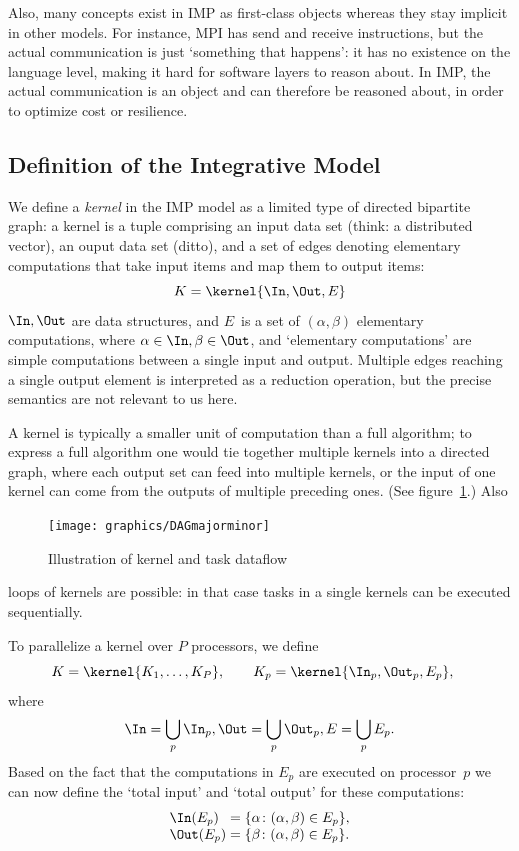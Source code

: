 Also, many concepts exist in \ac{IMP} as first-class objects whereas they stay
implicit in other models. For instance, MPI has send and receive instructions, but
the actual communication is just `something that happens': it has no existence 
on the language level, making it hard for software layers to reason about. 
In \ac{IMP}, the actual communication is an object and can therefore be reasoned about,
in order to optimize cost or resilience.

\subsection{Definition of the Integrative Model}

We define a \emph{kernel} in the \ac{IMP} model
as a limited type of directed bipartite graph:
a kernel is
a tuple comprising an input data set (think: a distributed vector), an
ouput data set (ditto), and a set of edges denoting elementary
computations that take input items and map them to output items:
\[ K=\kernel{\In,\Out,E} \]
$\In,\Out$ are data structures, and
$E$~is a set of $(\alpha,\beta)$ elementary computations, where
  $\alpha\in\In, \beta\in\Out$,
and `elementary computations' are simple computations between a single
input and output. Multiple edges reaching a single output element is
interpreted as a reduction operation, but the precise semantics are
not relevant to us here.

A kernel is typically a smaller unit of computation than a full
algorithm; to express a full algorithm one would tie together multiple
kernels into a directed graph, where each output set can feed into multiple
kernels, or the input of one kernel can come from the outputs of
multiple preceding ones. (See figure~\ref{fig:majorminor}.) Also
\begin{figure}
\texttt{[image: graphics/DAGmajorminor]}
\caption{Illustration of kernel and task dataflow}
\label{fig:majorminor}
\end{figure}
loops of kernels are possible: in that case tasks in a single kernels
can be executed sequentially.

To parallelize a kernel over $P$ processors, we define 
\[ K=\kernel{ K_1,\ldots,K_P }, \qquad
 K_p=\kernel{ \In_p,\Out_p,E_p },\quad
\]
where
\[   \In=\bigcup_p \In_p,\Out=\bigcup_p \Out_p,E=\bigcup_p E_p.
\]
Based on the fact that the computations in $E_p$ are executed on
processor~$p$ we can now define the `total input' and `total output'
for these computations:
\[
\begin{array}{l@{{}={}}l}
\In(E_p)  &\{ \alpha\colon (\alpha,\beta)\in E_p\}, \\
\Out(E_p) &\{ \beta\colon (\alpha,\beta)\in E_p \}.
\end{array}
\]

